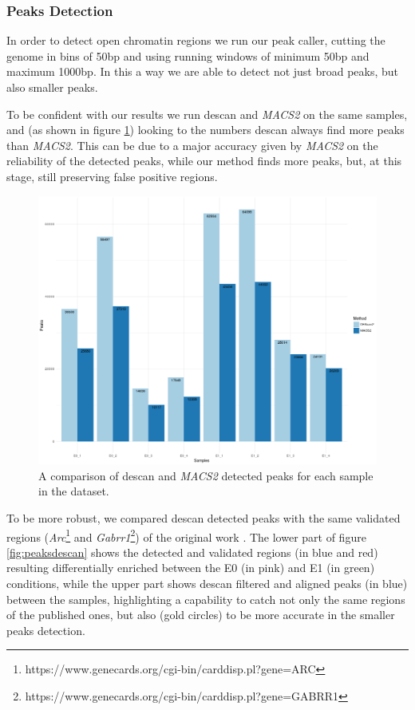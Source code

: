 \subsubsection{Peaks Detection}

In order to detect open chromatin regions we run our peak caller, cutting the genome in bins of 50bp and using running windows of minimum 50bp and maximum 1000bp.
In this a way we are able to detect not just broad peaks, but also smaller peaks.

To be confident with our results we run \gls{descan} and \textit{MACS2}  \cite{Zhang2008} on the same samples, and (as shown in figure \ref{fig:des2m2peaks}) looking to the numbers \gls{descan} always find more peaks than \textit{MACS2}.
This can be due to a major accuracy given by \textit{MACS2} on the reliability of the detected peaks, while our method finds more peaks, but, at this stage, still preserving false positive regions.

\begin{figure}[H]
\includegraphics[width=\textwidth,height=\textheight,keepaspectratio]{img/descan2/d2m2_peaks_number.png}
\caption[The \gls{descan} and \textit{MACS2} peaks detection]{A comparison of \gls{descan} and \textit{MACS2} detected peaks for each sample in the dataset.}
\label{fig:des2m2peaks}
\centering
\end{figure}

To be more robust, we compared \gls{descan} detected peaks with the same validated regions (\textit{Arc}\footnote{https://www.genecards.org/cgi-bin/carddisp.pl?gene=ARC} and \textit{Gabrr1}\footnote{https://www.genecards.org/cgi-bin/carddisp.pl?gene=GABRR1}) of the original work \cite{Su2017}.
The lower part of figure \ref{fig:peaksdescan} shows the detected and validated regions (in blue and red) resulting differentially enriched between the E0 (in pink) and E1 (in green) conditions, while the upper part shows \gls{descan} filtered and aligned peaks (in blue) between the samples, highlighting a capability to catch not only the same regions of the published ones, but also (gold circles) to be more accurate in the smaller peaks detection.

